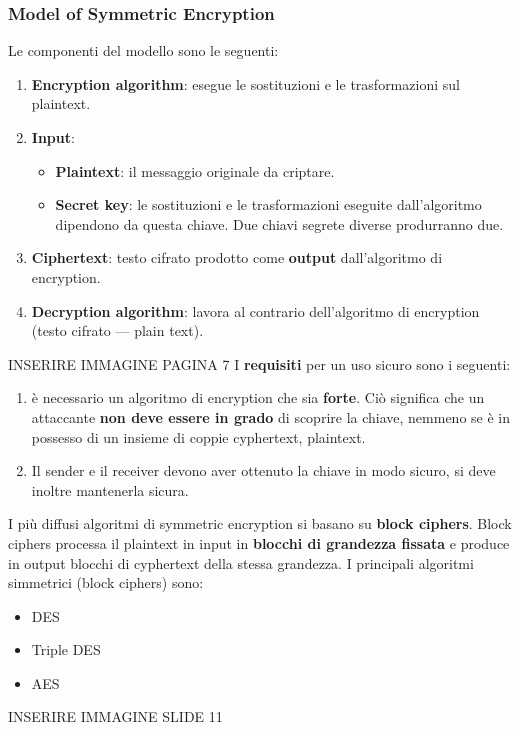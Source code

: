 \documentclass[12pt]{article}
\begin{document}
		\subsubsection{Model of Symmetric Encryption}
			Le componenti del modello sono le seguenti:
			\begin{enumerate}
				\item \textbf{Encryption algorithm}: esegue le sostituzioni e le trasformazioni sul plaintext.
				\item \textbf{Input}: 
					\begin{itemize}
						\item \textbf{Plaintext}: il messaggio originale da criptare.
						\item \textbf{Secret key}: le sostituzioni e le trasformazioni eseguite dall'algoritmo dipendono da questa chiave. Due chiavi segrete diverse produrranno due.
					\end{itemize} 
				\item \textbf{Ciphertext}: testo cifrato prodotto come \textbf{output} dall'algoritmo di encryption.
				\item \textbf{Decryption algorithm}: lavora al contrario dell'algoritmo di encryption (testo cifrato --- plain text).
			\end{enumerate}	
			INSERIRE IMMAGINE PAGINA 7
			I \textbf{requisiti} per un uso sicuro sono i seguenti:
			\begin{enumerate}
				\item è necessario un algoritmo di encryption che sia \textbf{forte}. Ciò significa che un attaccante \textbf{non deve essere in grado} di scoprire la chiave, nemmeno se è in possesso di un insieme di coppie cyphertext, plaintext.
				\item  Il sender e il receiver devono aver ottenuto la chiave in modo sicuro, si deve inoltre mantenerla sicura.
			\end{enumerate}
			I più diffusi algoritmi di symmetric encryption si basano su \textbf{block ciphers}. Block ciphers processa il plaintext in input in \textbf{blocchi di grandezza fissata} e produce in output blocchi di cyphertext della stessa grandezza. I principali algoritmi simmetrici (block ciphers) sono:
			\begin{itemize}
				\item DES
				\item Triple DES
				\item AES
			\end{itemize}
			INSERIRE IMMAGINE SLIDE 11
\end{document}
